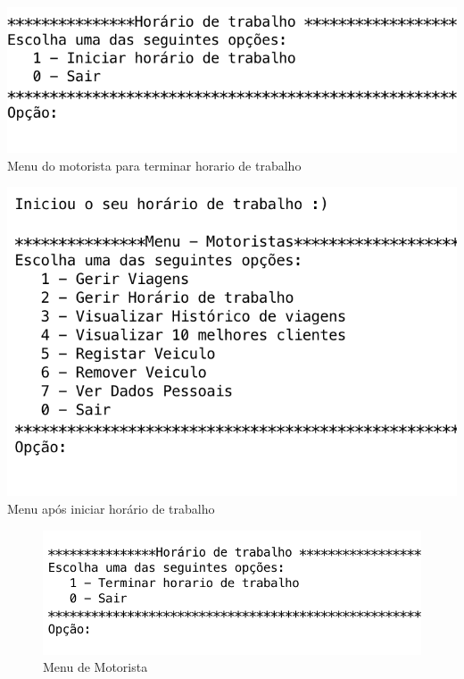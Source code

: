 \noindent\begin{minipage}[b]{.4\textwidth}
	\includegraphics[scale=0.55]{imagem/iniciarHorarioTrabalho}
	\small{Menu do motorista para terminar horario de trabalho}
\end{minipage} 
\hfill
\begin{minipage}[b]{.4\textwidth}
	\includegraphics[scale=0.5]{imagem/iniciouHorarioTrabalho}
	\small{Menu após iniciar horário de trabalho}
\end{minipage}
\hfill



\begin{figure}[htpb]
	\centering
	\includegraphics[scale=0.6]{imagem/gerirHorarioTrabalho}
	\caption{Menu de Motorista }
	\label{p3:fig:p3_gerirHorarioTrabalho}
\end{figure}

